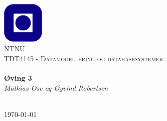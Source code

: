 \begin{titlepage}
\begin{center}
\includegraphics[width=0.15\textwidth]{img/ntnulogo.PNG}~\\[1cm]

\textsc{\LARGE NTNU}\\[1.5cm]

\textsc{\Large TDT4145 - Datamodellering og databasesystemer}\\[0.5cm]

\HRule \\[0.4cm]
{ \huge \bfseries Øving 3}\\[0.5cm]
{\large \textit{Mathias Ose og \O yvind Robertsen}}\\[0.2cm]
\HRule \\[1.5cm]



\vfill

{\large \today}
\end{center}
\end{titlepage}
